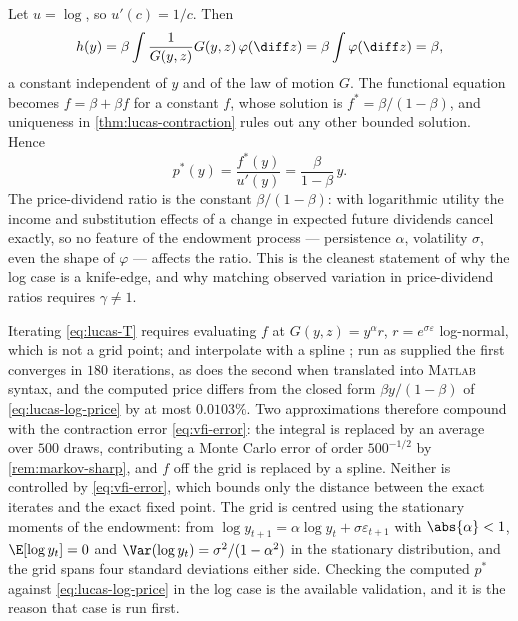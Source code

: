 \begin{eg}\label{eg:lucas-log}
	Let $u=\log$, so $u'(c)=1/c$. Then
	\[
		h(y)=\beta\int\frac{1}{G(y,z)}G(y,z)\,\varphi(\diff z)
		=\beta\int\varphi(\diff z)=\beta,
	\]
	a constant independent of $y$ and of the law of motion $G$. The functional
	equation becomes $f=\beta+\beta f$ for a constant $f$, whose solution is
	$f^{\ast}=\beta/(1-\beta)$, and uniqueness in \autoref{thm:lucas-contraction}
	rules out any other bounded solution. Hence
	\begin{equation}\label{eq:lucas-log-price}
		p^{\ast}(y)=\frac{f^{\ast}(y)}{u'(y)}=\frac{\beta}{1-\beta}\,y .
	\end{equation}
	The price-dividend ratio is the constant $\beta/(1-\beta)$: with logarithmic
	utility the income and substitution effects of a change in expected future
	dividends cancel exactly, so no feature of the endowment process ---
	persistence $\alpha$, volatility $\sigma$, even the shape of $\varphi$ ---
	affects the ratio. This is the cleanest statement of why the log case is a
	knife-edge, and why matching observed variation in price-dividend ratios
	requires $\gamma\neq1$.
\end{eg}

\begin{remark}\label{rem:lucas-numerics}
	Iterating \eqref{eq:lucas-T} requires evaluating $f$ at
	$G(y,z)=y^{\alpha}r$, $r=e^{\sigma\varepsilon}$ log-normal, which is not a grid
	point;  and  interpolate
	with a spline \autocite[slide 61]{fukuda2026dynamic}; run as supplied the
	first converges in $180$ iterations, as does the second when translated into
	\textsc{Matlab} syntax, and the computed price differs from the closed form
	$\beta y/(1-\beta)$ of \eqref{eq:lucas-log-price} by at most $0.0103\%$. Two
	approximations therefore compound
	with the contraction error \eqref{eq:vfi-error}: the integral is replaced by an
	average over $500$ draws, contributing a Monte Carlo error of order
	$500^{-1/2}$ by \autoref{rem:markov-sharp}, and $f$ off the grid is replaced by
	a spline. Neither is controlled by \eqref{eq:vfi-error}, which bounds only the
	distance between the exact iterates and the exact fixed point. The grid is
	centred using the stationary moments of the endowment: from
	$\log y_{t+1}=\alpha\log y_t+\sigma\varepsilon_{t+1}$ with $\abs{\alpha}<1$,
	$\E[\log y_t]=0$ and $\Var(\log y_t)=\sigma^{2}/(1-\alpha^{2})$ in the
	stationary distribution, and the grid spans four standard deviations either
	side. Checking the computed $p^{\ast}$ against \eqref{eq:lucas-log-price} in the
	log case is the available validation, and it is the reason that case is run
	first.
\end{remark}

